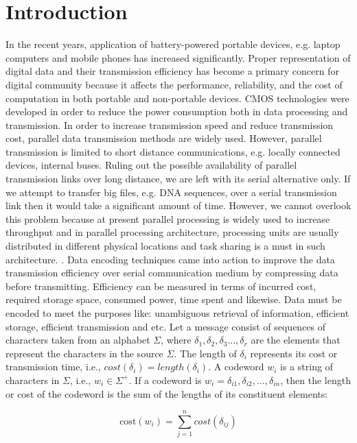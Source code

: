 \documentclass[preprint,12pt]{elsarticle}%
\begin{document}

\section{Introduction}
\label{sec1}
In the recent years, application of battery-powered portable devices, e.g. laptop computers and mobile phones has increased significantly. Proper representation of digital data and their transmission efficiency has become a primary concern for digital community because it affects the performance, reliability, and the cost of computation in both portable and non-portable devices. CMOS technologies were developed in order to reduce the power consumption both in data processing and transmission. In order to increase transmission speed and reduce transmission cost, parallel data transmission methods are widely used. However, parallel transmission is limited to short distance communications, e.g. locally connected devices, internal buses. Ruling out the possible availability of parallel transmission links over long distance, we are left with its serial alternative only. If we attempt to transfer big files, e.g. DNA sequences, over a serial transmission link then it would take a significant amount of time. However, we cannot overlook this problem because at present parallel processing is widely used to increase throughput and in parallel processing architecture, processing units are usually distributed in different physical locations and task sharing is a must in such architecture.    
.
Data encoding techniques came into action to improve the data transmission efficiency over serial communication medium by compressing data before transmitting. Efficiency can be measured in terms of incurred cost, required storage space, consumed power, time spent and likewise. Data must be encoded to meet the purposes like: unambiguous retrieval of information, efficient storage, efficient transmission and etc. Let a message consist of sequences of characters taken from an alphabet $\Sigma$, where  $\delta_1,\delta_2,\delta_3\ldots,\delta_r$ are the elements that represent the characters in the source $\Sigma$. The length of $\delta_i$ represents its cost or transmission time, i.e., $cost\left(\delta_i\right)= length(\delta_i)$. A codeword $w_i$ is a string of characters in $\Sigma$, i.e., $w_i\in\Sigma^{+}$. If a codeword is $w_i=\delta_{i1},\delta_{i2},\ldots,\delta_{in}$, then the length or cost of the codeword is the sum of the lengths of its constituent elements:

\begin{equation}
\label{eqn1}
  \text{cost}\left(w_i\right)=\sum_{j=1}^{n}cost\left(\delta_{ij}\right)
\end{equation} 
  
\end{document}
